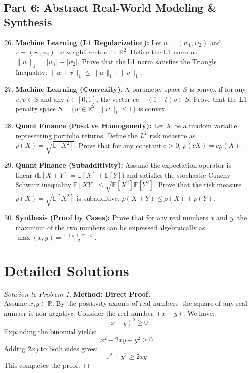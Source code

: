 \documentclass[11pt]{article}
\begin{document}
\subsection{Part 6: Abstract Real-World Modeling \& Synthesis}
\begin{enumerate}
    \setcounter{enumi}{25}
    \item \textbf{Machine Learning (L1 Regularization):} Let $w = (w_1, w_2)$ and $v = (v_1, v_2)$ be weight vectors in $\mathbb{R}^2$. Define the L1 norm as $\|w\|_1 = |w_1| + |w_2|$. Prove that the L1 norm satisfies the Triangle Inequality: $\|w + v\|_1 \le \|w\|_1 + \|v\|_1$.
    \item \textbf{Machine Learning (Convexity):} A parameter space $S$ is convex if for any $u, v \in S$ and any $t \in [0, 1]$, the vector $tu + (1-t)v \in S$. Prove that the L1 penalty space $S = \{w \in \mathbb{R}^2 : \|w\|_1 \le 1\}$ is convex.
    \item \textbf{Quant Finance (Positive Homogeneity):} Let $X$ be a random variable representing portfolio returns. Define the $L^2$ risk measure as $\rho(X) = \sqrt{\mathbb{E}[X^2]}$. Prove that for any constant $c > 0$, $\rho(cX) = c\rho(X)$.
    \item \textbf{Quant Finance (Subadditivity):} Assume the expectation operator is linear ($\mathbb{E}[X+Y] = \mathbb{E}[X] + \mathbb{E}[Y]$) and satisfies the stochastic Cauchy-Schwarz inequality $\mathbb{E}[XY] \le \sqrt{\mathbb{E}[X^2]\mathbb{E}[Y^2]}$. Prove that the risk measure $\rho(X) = \sqrt{\mathbb{E}[X^2]}$ is subadditive: $\rho(X + Y) \le \rho(X) + \rho(Y)$.
    \item \textbf{Synthesis (Proof by Cases):} Prove that for any real numbers $x$ and $y$, the maximum of the two numbers can be expressed algebraically as $\max(x, y) = \frac{x + y + |x - y|}{2}$.
\end{enumerate}

\newpage

\section{Detailed Solutions}
\label{sec:solutions}

\begin{proof}[Solution to Problem 1]
    \textbf{Method: Direct Proof.} \\
    Assume $x, y \in \mathbb{R}$. By the positivity axioms of real numbers, the square of any real number is non-negative. Consider the real number $(x - y)$. We have:
    \[ (x - y)^2 \ge 0 \]
    Expanding the binomial yields:
    \[ x^2 - 2xy + y^2 \ge 0 \]
    Adding $2xy$ to both sides gives:
    \[ x^2 + y^2 \ge 2xy \]
    This completes the proof.
\end{proof}
\end{document}
